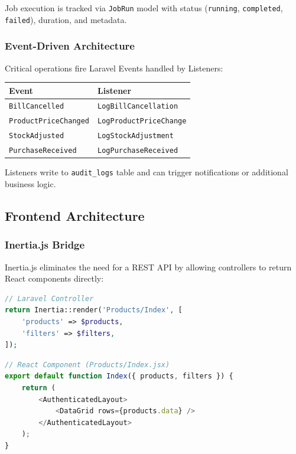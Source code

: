 Job execution is tracked via \texttt{JobRun} model with status (\texttt{running}, \texttt{completed}, \texttt{failed}), duration, and metadata.

\subsubsection{Event-Driven Architecture}

Critical operations fire Laravel Events handled by Listeners:

\begin{center}
\begin{tabular}{@{}ll@{}}
\toprule
\textbf{Event} & \textbf{Listener} \\
\midrule
\texttt{BillCancelled} & \texttt{LogBillCancellation} \\
\texttt{ProductPriceChanged} & \texttt{LogProductPriceChange} \\
\texttt{StockAdjusted} & \texttt{LogStockAdjustment} \\
\texttt{PurchaseReceived} & \texttt{LogPurchaseReceived} \\
\bottomrule
\end{tabular}
\end{center}

Listeners write to \texttt{audit\_logs} table and can trigger notifications or additional business logic.

\subsection{Frontend Architecture}

\subsubsection{Inertia.js Bridge}

Inertia.js eliminates the need for a REST API by allowing controllers to return React components directly:

\begin{lstlisting}[language=PHP,label=lst:inertia-backend]
// Laravel Controller
return Inertia::render('Products/Index', [
    'products' => $products,
    'filters' => $filters,
]);
\end{lstlisting}

\begin{lstlisting}[language=JavaScript,label=lst:inertia-frontend]
// React Component (Products/Index.jsx)
export default function Index({ products, filters }) {
    return (
        <AuthenticatedLayout>
            <DataGrid rows={products.data} />
        </AuthenticatedLayout>
    );
}
\end{lstlisting}

